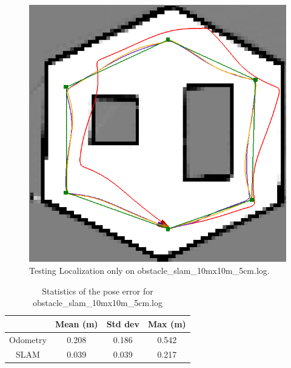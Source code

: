 \documentclass[journal]{IEEEtran}
\begin{document}
            \begin{figure}
                \centering
                \includegraphics[width=1\linewidth]{obstacle_slam_10mx10m_5cm.png}
                \caption{Testing Localization only on obstacle\_slam\_10mx10m\_5cm.log.}
                \label{fig:localization}
            \end{figure}
            
            \begin{table}[b]
                \centering
                \begin{tabular}{|c|c|c|c|} \hline
                  & Mean (m) &   Std dev &   Max (m) \\ \hline
                  Odometry & 0.208  & 0.186  &  0.542 \\ \hline
                  SLAM & 0.039 & 0.039 &  0.217 \\ \hline
                \end{tabular}
            \caption{Statistics of the pose error for obstacle\_slam\_10mx10m\_5cm.log}
                \label{tab:localization_error}
            \end{table}
            
\end{document}
